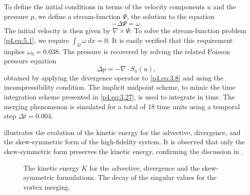 To define the initial conditions in terms of the velocity components $u$ and the pressure $p$, we define a stream-function $\Psi$, the solution to the equation 
\begin{equation} \label{p4.eq:5.1}
	- \Delta \Psi = \omega.
\end{equation}
The initial velocity is then given by $\nabla \times \Psi$. To solve the stream-function problem \eqref{p4.eq:5.1}, we require $\int_{\Omega} \omega \ dx= 0$. It is easily verified that this requirement implies $\omega_0 = 0.038$. The pressure is recovered by solving the related Poisson pressure equation 
\begin{equation*}
\Delta p = - \nabla \cdot S_{u}(u),
\end{equation*}
obtained by applying the divergence operator to \eqref{p4.eq:3.8} and using the incompressibility condition.
 The implicit midpoint scheme, to mimic the time integration scheme presented in \eqref{p4.eq:3.27}, is used to integrate in time. The merging phenomenon is simulated for a total of $18$ time units using a temporal step $\Delta t=0.004$.

 illustrates the evolution of the kinetic energy for the advective, divergence, and the skew-symmetric form of the high-fidelity system. It is observed that only the skew-symmetric form preserves the kinetic energy, confirming the discussion in .


\begin{figure} [t]
	\begin{centering}
	\caption{\protect{} The kinetic energy $K$ for the advective, divergence and the skew-symmetric formulations. \protect{} The decay of the singular values for the vortex merging.}
	\label{p4.fig:unstable_full_models}
	\end{centering}
\end{figure}

